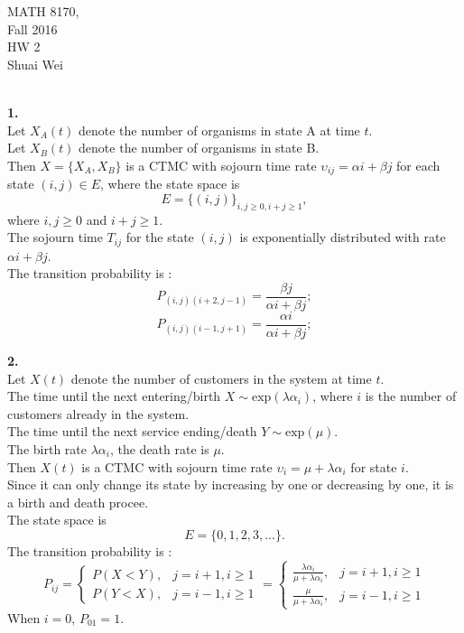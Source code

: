\documentclass{amsart}
\theoremstyle{plain}
\theoremstyle{definition}
\begin{document}
\noindent MATH 8170,  \\
Fall 2016\\
HW 2\\
Shuai Wei \\
\
\textwidth 6.0in \oddsidemargin 0.0in

\noindent \textbf{1.} \\
Let $X_A(t)$ denote the number of organisms in state A at time $t$.\\
Let $X_B(t)$ denote the number of organisms in state B.\\
Then $X = \{X_A, X_B\}$ is a CTMC with sojourn time rate $\upsilon_{ij} = \alpha i + \beta j$ for each state $(i,j) \in E$, where the state space is 
\[E = \{(i,j)\}_{i,j\geq 0,i +j \geq 1} ,\]
where $i,j \geq 0$ and $i+j \geq 1 $.\\
The sojourn time $T_{ij}$ for the state $(i,j)$ is exponentially distributed with rate $\alpha i + \beta j$.\\
The transition probability is :
\[ P_{(i,j)(i+2,j-1)} = \frac{\beta j}{\alpha i + \beta j}; \]
\[ P_{(i,j)(i-1,j+1)} = \frac{\alpha i}{\alpha i + \beta j}; \]

\vspace{3mm}

\noindent \textbf{2.}\\
Let $X(t)$ denote the number of customers in the system at time $t$. \\
The time until the next entering/birth $X \sim \text{exp}(\lambda \alpha_i)$, where $i$ is the number of customers already in the system.\\
The time until the next service ending/death $Y \sim \text{exp}(\mu)$.\\
The birth rate $\lambda \alpha_i $, the death rate is $\mu$.\\
Then $X(t)$ is a CTMC with sojourn time rate $\upsilon_i = \mu+ \lambda \alpha_i$ for state $i$.\\
Since it can only change its state by increasing by one or decreasing by one, it is a birth and death procee.\\
The state space is 
\[E= \{0,1,2,3,...\}.\]
The transition probability is :
\[ 
  	P_{ij}  =  \left\{ 
					\begin{array}{ll}
  					  P(X<Y), & j = i+1, i\geq 1 \\ 
					  P(Y<X),& j = i-1, i\geq 1  
					\end{array}
			 	  \right. 
  	           =  \left\{ 
					\begin{array}{ll}
  					  \frac{\lambda \alpha_i}{\mu + \lambda \alpha_i}, & j = i+1, i\geq 1 \\ 
					  \frac{\mu}{\mu+\lambda\alpha_i},& j = i-1, i\geq 1  
					\end{array}
			 	  \right. 
\]
When $i = 0$, $P_{01} = 1$.
\end{document}

